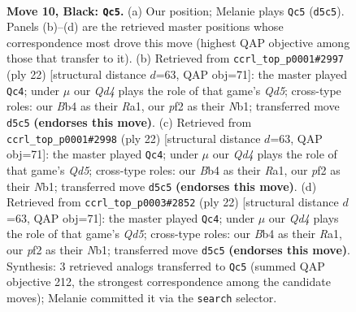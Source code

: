 \documentclass[11pt]{article}
\begin{document}
\clearpage

\begin{figure}[p]\centering
\begin{subfigure}{0.46\textwidth}\centering
\resizebox{\linewidth}{!}{%
\newchessgame
\chessboard[
  setfen={rnb2rk1/1p3ppp/p3pn2/3q4/1b6/2NBPN2/PP3PPP/R1BQ1RK1 b - - 1 10},
  showmover=false,
  pgfstyle=straightmove, color=movearrow, markmove={d5-c5}
]}
\caption{}
\end{subfigure}\hfill
\begin{subfigure}{0.46\textwidth}\centering
\resizebox{\linewidth}{!}{%
\newchessgame
\chessboard[
  setfen={r1b2rk1/pp3ppp/1qn2n2/2bQ4/8/4PNP1/PP3PBP/RNB2RK1 w - - 1 12},
  showmover=false,
  pgfstyle=straightmove, color=movearrow, markmove={d5-c4}
]}
\caption{}
\end{subfigure}
\\[4pt]
\begin{subfigure}{0.46\textwidth}\centering
\resizebox{\linewidth}{!}{%
\newchessgame
\chessboard[
  setfen={r1b2rk1/pp3ppp/1qn2n2/2bQ4/8/4PNP1/PP3PBP/RNB2RK1 w - - 1 12},
  showmover=false,
  pgfstyle=straightmove, color=movearrow, markmove={d5-c4}
]}
\caption{}
\end{subfigure}\hfill
\begin{subfigure}{0.46\textwidth}\centering
\resizebox{\linewidth}{!}{%
\newchessgame
\chessboard[
  setfen={r1b2rk1/pp3ppp/1qn2n2/2bQ4/8/4PNP1/PP3PBP/RNB2RK1 w - - 1 12},
  showmover=false,
  pgfstyle=straightmove, color=movearrow, markmove={d5-c4}
]}
\caption{}
\end{subfigure}
\caption{\textbf{Move 10, Black: \texttt{Qc5}.} (a) Our position; Melanie plays \texttt{Qc5} (\texttt{d5c5}). Panels (b)--(d) are the retrieved master positions whose correspondence most drove this move (highest QAP objective among those that transfer to it). (b) Retrieved from \texttt{ccrl\_top\_p0001\#2997} (ply 22) [structural distance $d$=63, QAP obj=71]: the master played \texttt{Qc4}; under $\mu$ our \emph{Qd4} plays the role of that game's \emph{Qd5}; cross-type roles: our \emph{B}b4 as their \emph{R}a1, our \emph{p}f2 as their \emph{N}b1; transferred move \texttt{d5c5} \textbf{(endorses this move)}. (c) Retrieved from \texttt{ccrl\_top\_p0001\#2998} (ply 22) [structural distance $d$=63, QAP obj=71]: the master played \texttt{Qc4}; under $\mu$ our \emph{Qd4} plays the role of that game's \emph{Qd5}; cross-type roles: our \emph{B}b4 as their \emph{R}a1, our \emph{p}f2 as their \emph{N}b1; transferred move \texttt{d5c5} \textbf{(endorses this move)}. (d) Retrieved from \texttt{ccrl\_top\_p0003\#2852} (ply 22) [structural distance $d$=63, QAP obj=71]: the master played \texttt{Qc4}; under $\mu$ our \emph{Qd4} plays the role of that game's \emph{Qd5}; cross-type roles: our \emph{B}b4 as their \emph{R}a1, our \emph{p}f2 as their \emph{N}b1; transferred move \texttt{d5c5} \textbf{(endorses this move)}. Synthesis: 3 retrieved analogs transferred to \texttt{Qc5} (summed QAP objective 212, the strongest correspondence among the candidate moves); Melanie committed it via the \texttt{search} selector.}
\label{fig:thought-m19}
\end{figure}
\end{document}
